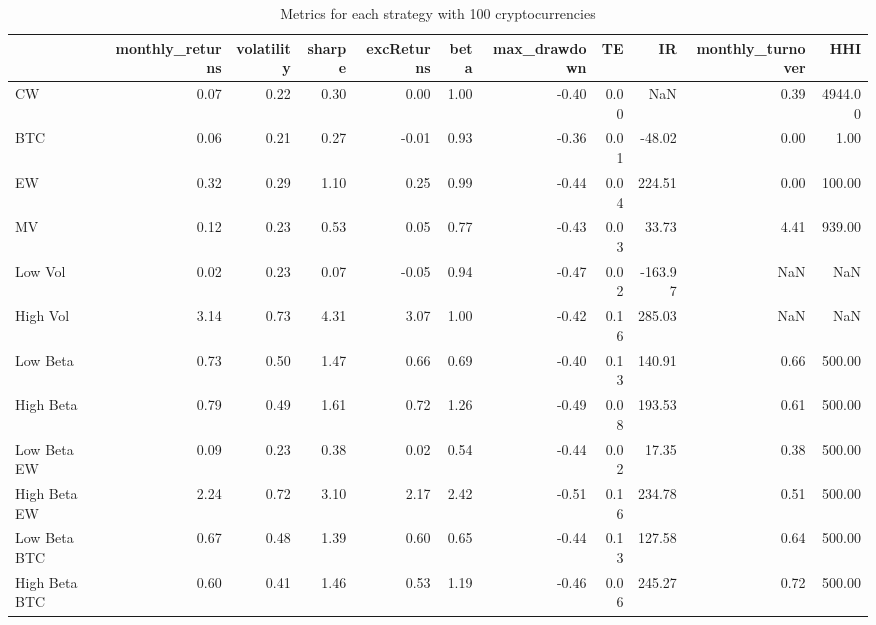 \begin{table}
\centering
\caption{Metrics for each strategy with 100 cryptocurrencies}
\label{metrics100}
\begin{tabular}{lrrrrrrrrrr}
\toprule
{} &  monthly\_returns &  volatility &  sharpe &  excReturns &  beta &  max\_drawdown &   TE &      IR &  monthly\_turnover &     HHI \\
\midrule
CW            &             0.07 &        0.22 &    0.30 &        0.00 &  1.00 &         -0.40 & 0.00 &     NaN &              0.39 & 4944.00 \\
BTC           &             0.06 &        0.21 &    0.27 &       -0.01 &  0.93 &         -0.36 & 0.01 &  -48.02 &              0.00 &    1.00 \\
EW            &             0.32 &        0.29 &    1.10 &        0.25 &  0.99 &         -0.44 & 0.04 &  224.51 &              0.00 &  100.00 \\
MV            &             0.12 &        0.23 &    0.53 &        0.05 &  0.77 &         -0.43 & 0.03 &   33.73 &              4.41 &  939.00 \\
Low Vol       &             0.02 &        0.23 &    0.07 &       -0.05 &  0.94 &         -0.47 & 0.02 & -163.97 &               NaN &     NaN \\
High Vol      &             3.14 &        0.73 &    4.31 &        3.07 &  1.00 &         -0.42 & 0.16 &  285.03 &               NaN &     NaN \\
Low Beta      &             0.73 &        0.50 &    1.47 &        0.66 &  0.69 &         -0.40 & 0.13 &  140.91 &              0.66 &  500.00 \\
High Beta     &             0.79 &        0.49 &    1.61 &        0.72 &  1.26 &         -0.49 & 0.08 &  193.53 &              0.61 &  500.00 \\
Low Beta EW   &             0.09 &        0.23 &    0.38 &        0.02 &  0.54 &         -0.44 & 0.02 &   17.35 &              0.38 &  500.00 \\
High Beta EW  &             2.24 &        0.72 &    3.10 &        2.17 &  2.42 &         -0.51 & 0.16 &  234.78 &              0.51 &  500.00 \\
Low Beta BTC  &             0.67 &        0.48 &    1.39 &        0.60 &  0.65 &         -0.44 & 0.13 &  127.58 &              0.64 &  500.00 \\
High Beta BTC &             0.60 &        0.41 &    1.46 &        0.53 &  1.19 &         -0.46 & 0.06 &  245.27 &              0.72 &  500.00 \\
\bottomrule
\end{tabular}
\end{table}
